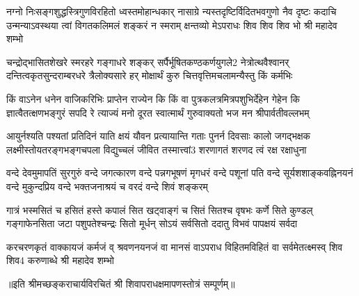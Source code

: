 \fourlineindentedshloka
{नग्नो निःसङ्गशुद्धस्त्रिगुणविरहितो ध्वस्तमोहान्धकार्}
{नासाग्रे न्यस्तदृष्टिर्विदितभवगुणो नैव दृष्टः कदाचि}
{उन्मन्याऽवस्थया त्वां विगतकलिमलं शङ्करं न स्मराम्}
{क्षन्तव्यो मेऽपराधः शिव शिव शिव भो श्री महादेव शम्भो} %

\fourlineindentedshloka
{चन्द्रोद्भासितशेखरे स्मरहरे गङ्गाधरे शङ्कर्}
{सर्पैर्भूषितकण्ठकर्णयुगले2 नेत्रोत्थवैश्वानर्}
{दन्तित्वकृतसुन्दराम्बरधरे त्रैलोक्यसारे हर्}
{मोक्षार्थं कुरु चित्तवृत्तिमचलामन्यैस्तु किं कर्मभिः} %


\fourlineindentedshloka
{किं वाऽनेन धनेन वाजिकरिभिः प्राप्तेन राज्येन कि}
{किं वा पुत्रकलत्रमित्रपशुभिर्देहेन गेहेन कि}
{ज्ञात्वैतत्क्षणभङ्गुरं सपदि रे त्याज्यं मनो दूरत}
{स्वात्मार्थं गुरुवाक्यतो भज मन श्रीपार्वतीवल्लभम्} %

\fourlineindentedshloka
{आयुर्नश्यति पश्यतां प्रतिदिनं याति क्षयं यौवन}
{प्रत्यायान्ति गताः पुनर्न दिवसाः कालो जगद्भक्षक}
{लक्ष्मीस्तोयतरङ्गभङ्गचपला विद्युच्चलं जीवित}
{तस्मात्त्वां3 शरणागतं शरणद त्वं रक्ष रक्षाधुना} %


\fourlineindentedshloka
{वन्दे देवमुमापतिं सुरगुरुं वन्दे जगत्कारण}
{वन्दे पन्नगभूषणं मृगधरं वन्दे पशूनां पति}
{वन्दे सूर्यशशाङ्कवह्निनयनं वन्दे मुकुन्दप्रिय}
{वन्दे भक्तजनाश्रयं च वरदं वन्दे शिवं शङ्करम्} %

\fourlineindentedshloka
{गात्रं भस्मसितं च हसितं हस्ते कपालं सित}
{खट्वाङ्गं च सितं सितश्च वृषभः कर्णे सिते कुण्डल्}
{गङ्गाफेनसिता जटा पशुपतेश्चन्द्रः सितो मूर्धन्}
{सोऽयं सर्वसितो ददातु विभवं पापक्षयं सर्वदा} %

\fourlineindentedshloka
{करचरणकृतं वाक्कायजं कर्मजं व्}
{श्रवणनयनजं वा मानसं वाऽपराध}
{विहितमविहितं वा सर्वमेतत्क्ष्मस्व्}
{शिव शिव4 करुणाब्धे श्री महादेव शम्भो} %


॥इति श्रीमच्छङ्कराचार्यविरचितं श्री शिवापराधक्षमापणस्तोत्रं सम्पूर्णम्॥
